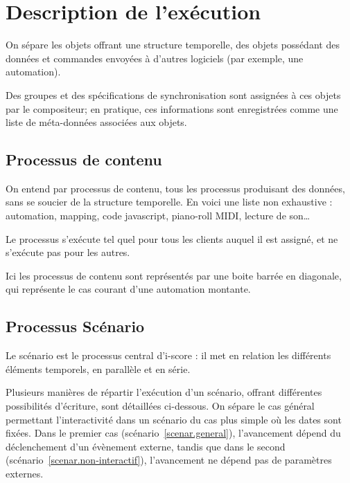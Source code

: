 \documentclass[10pt]{article}
\begin{document}
\section{Description de l'exécution}\label{sec.description}
On sépare les objets offrant une structure temporelle, des objets possédant des données et commandes envoyées à d'autres logiciels (par exemple, une automation).

Des groupes et des spécifications de synchronisation sont assignées à ces objets par le compositeur; en pratique, ces informations sont enregistrées comme une liste de méta-données associées aux objets.


\subsection{Processus de contenu}
On entend par processus de contenu, tous les processus produisant des données, sans se soucier de la structure temporelle. 
En voici une liste non exhaustive : automation, mapping, code javascript, piano-roll MIDI, lecture de son\dots

Le processus s'exécute tel quel pour tous les clients auquel il est assigné, 
et ne s'exécute pas pour les autres.

Ici les processus de contenu sont représentés par une boite barrée en diagonale, qui représente le cas courant d'une automation montante.

\subsection{Processus Scénario}
Le scénario est le processus central d'i-score : il met en relation les différents éléments temporels, en parallèle et en série.

Plusieurs manières de répartir l'exécution d'un scénario, offrant différentes possibilités d'écriture, sont détaillées ci-dessous. 
On sépare le cas général permettant l'interactivité dans un scénario du cas plus simple où les dates sont fixées.
Dans le premier cas (scénario~\ref{scenar.general}), l'avancement dépend du déclenchement d'un évènement externe, tandis que dans le second (scénario~\ref{scenar.non-interactif}), l'avancement ne dépend pas de paramètres externes. 
\end{document}
